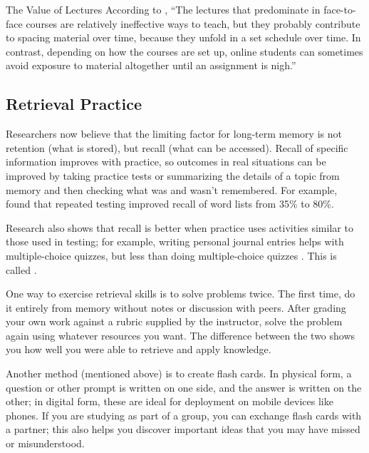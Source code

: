 \begin{aside}{The Value of Lectures}
  According to \cite{Mill2016a}, ``The lectures that predominate in
  face-to-face courses are relatively ineffective ways to teach, but
  they probably contribute to spacing material over time, because they
  unfold in a set schedule over time. In contrast, depending on how the
  courses are set up, online students can sometimes avoid exposure to
  material altogether until an assignment is nigh.''
\end{aside}

\subsection{Retrieval Practice}\label{retrieval-practice}

Researchers now believe that the limiting factor for long-term memory is
not retention (what is stored), but recall (what can be accessed).
Recall of specific information improves with practice, so outcomes in
real situations can be improved by taking practice tests or summarizing
the details of a topic from memory and then checking what was and wasn't
remembered. For example, \cite{Karp2008} found that repeated testing
improved recall of word lists from 35\% to 80\%.

Research also shows that recall is better when practice uses
activities similar to those used in testing; for example, writing
personal journal entries helps with multiple-choice quizzes, but less
than doing multiple-choice quizzes \cite{Mill2016a}. This is
called .

One way to exercise retrieval skills is to solve problems twice. The
first time, do it entirely from memory without notes or discussion with
peers. After grading your own work against a rubric supplied by the
instructor, solve the problem again using whatever resources you want.
The difference between the two shows you how well you were able to
retrieve and apply knowledge.

Another method (mentioned above) is to create flash cards. In physical
form, a question or other prompt is written on one side, and the answer
is written on the other; in digital form, these are ideal for deployment
on mobile devices like phones. If you are studying as part of a group,
you can exchange flash cards with a partner; this also helps you
discover important ideas that you may have missed or misunderstood.

